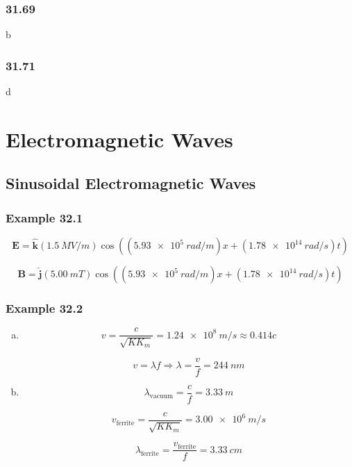 \documentclass{article}
\begin{document}
\subsubsection{31.69}

b

\subsubsection{31.71}

d

\section{Electromagnetic Waves}

\setcounter{subsection}{2}
\subsection{Sinusoidal Electromagnetic Waves}

\subsubsection{Example 32.1}

\[\mathbf{E} = \hat{\mathbf{k}} (\qty{1.5}{MV/m}) \cos ((\qty{5.93e5}{rad/m}) x + (\qty{1.78e14}{rad/s}) t)\]

\[\mathbf{B} = \hat{\mathbf{j}} (\qty{5.00}{mT}) \cos ((\qty{5.93e5}{rad/m}) x + (\qty{1.78e14}{rad/s}) t)\]

\subsubsection{Example 32.2}

\begin{enumerate}[(a)]
  \item

        \[v = \frac{c}{\sqrt{K K_m}} = \qty{1.24e8}{m/s} \approx 0.414 c\]

        \[v = \lambda f \Rightarrow \lambda = \frac{v}{f} = \qty{244}{nm}\]

  \item

        \[\lambda_\text{vacuum} = \frac{c}{f} = \qty{3.33}{m}\]

        \[v_\text{ferrite} = \frac{c}{\sqrt{K K_m}} = \qty{3.00e6}{m/s}\]

        \[\lambda_\text{ferrite} = \frac{v_\text{ferrite}}{f} = \qty{3.33}{cm}\]
\end{enumerate}
\end{document}
